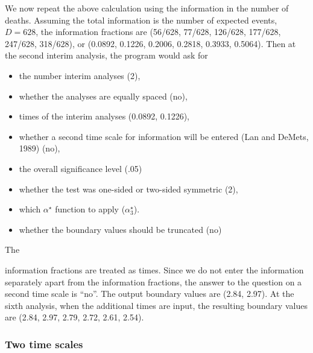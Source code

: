 We now repeat the above calculation using the information in the
number of deaths.  Assuming the total information is the number of
expected events, $D = 628$, the information fractions are (56/628,
77/628, 126/628, 177/628, 247/628, 318/628), or (0.0892, 0.1226,
0.2006, 0.2818, 0.3933, 0.5064).  Then at the second interim analysis,
the program would ask for {\singlespace \vspace*{-1em} 
\begin{itemize}
\item the number interim analyses (2), 
\item whether the analyses are equally spaced (no), 
\item times of the interim analyses (0.0892, 0.1226),
\item whether a second time scale for information will be entered (Lan and
DeMets, 1989) (no), 
\item the overall significance level (.05) 
\item whether the test was one-sided or two-sided symmetric (2), 
\item which $\alpha^{\star}$ function to apply ($\alpha^{\star}_3$).  
\item whether the boundary values should be truncated (no)
\end{itemize} The}
information fractions are treated as times.  Since we do not enter the
information separately apart from the information fractions, the answer to
the question on a second time scale is ``no''.  The output boundary values
are (2.84, 2.97).  At the sixth analysis, when the additional times are
input, the resulting boundary values are (2.84, 2.97, 2.79, 2.72, 2.61,
2.54).

\subsubsection*{Two time scales}

